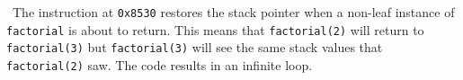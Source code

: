 \documentclass[12pt]{article}
\newenvironment{sol}[1][Solution]{\begin{trivlist}
		\item[\hskip \labelsep {\bfseries #1:}]}{\end{trivlist}}
\begin{document}
\begin{sol}
\begin{enumerate}[label=(\alph*)]
		\
		The instruction at \texttt{0x8530} restores the stack pointer when
		a non-leaf instance of \texttt{factorial} is about to return.
		This means that \texttt{factorial(2)} will return to \texttt{factorial(3)}
		but \texttt{factorial(3)} will see the same stack values that
		\texttt{factorial(2)} saw. The code results in an infinite loop.
	\end{enumerate}
\end{sol}
\end{document}
